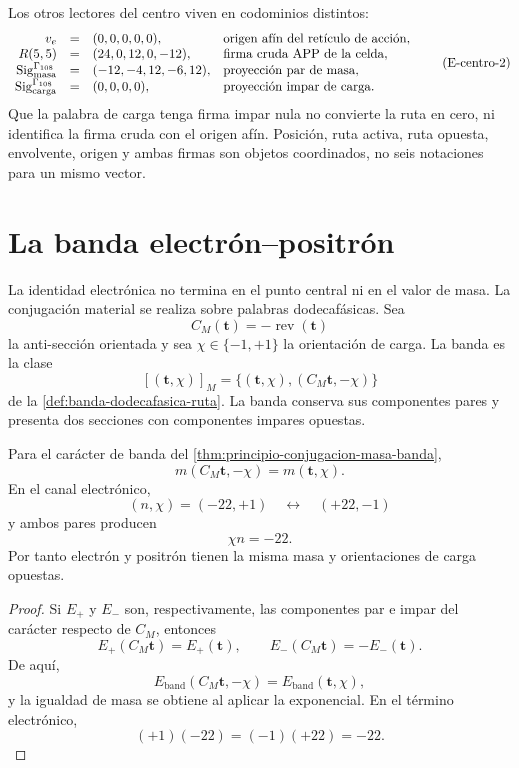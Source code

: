 Los otros lectores del centro viven en codominios distintos:
\[
\begin{array}{rcll}
 v_e&=&(0,0,0,0,0),
   &\text{origen afín del retículo de acción},\\
 R(5,5)&=&(24,0,12,0,-12),
   &\text{firma cruda APP de la celda},\\
 \operatorname{Sig}^{\Gamma_{108}}_{\rm masa}
   &=&(-12,-4,12,-6,12),
   &\text{proyección par de masa},\\
 \operatorname{Sig}^{\Gamma_{108}}_{\rm carga}
   &=&(0,0,0,0),
   &\text{proyección impar de carga}.
\end{array}
\tag{E-centro-2}\label{eq:electron-firmas-tipadas-rev8}
\]
Que la palabra de carga tenga firma impar nula no convierte la ruta en
cero, ni identifica la firma cruda con el origen afín. Posición, ruta
activa, ruta opuesta, envolvente, origen y ambas firmas son objetos
coordinados, no seis notaciones para un mismo vector.

\section{La banda electrón--positrón}

La identidad electrónica no termina en el punto central ni en el valor de
masa. La conjugación material se realiza sobre palabras dodecafásicas. Sea
\[
 C_M(\mathbf t)=-\operatorname{rev}(\mathbf t)
\]
la anti-sección orientada y sea
\(\chi\in\{-1,+1\}\) la orientación de carga. La banda es la clase
\[
 [(\mathbf t,\chi)]_M
 =
 \{(\mathbf t,\chi),(C_M\mathbf t,-\chi)\}
\]
de la \cref{def:banda-dodecafasica-ruta}. La banda conserva sus componentes
pares y presenta dos secciones con componentes impares opuestas.

\begin{theorem}
\label{thm:electron-positron-biografia-rev6}
Para el carácter de banda del
\cref{thm:principio-conjugacion-masa-banda},
\[
 m(C_M\mathbf t,-\chi)=m(\mathbf t,\chi).
\]
En el canal electrónico,
\[
 (n,\chi)=(-22,+1)
 \quad\longleftrightarrow\quad
 (+22,-1)
\]
y ambos pares producen
\[
 \chi n=-22.
\]
Por tanto electrón y positrón tienen la misma masa y orientaciones de
carga opuestas.
\end{theorem}

\begin{proof}
Si \(E_+\) y \(E_-\) son, respectivamente, las componentes par e impar del
carácter respecto de \(C_M\), entonces
\[
 E_+(C_M\mathbf t)=E_+(\mathbf t),
 \qquad
 E_-(C_M\mathbf t)=-E_-(\mathbf t).
\]
De aquí,
\[
 E_{\mathrm{band}}(C_M\mathbf t,-\chi)
 =
 E_{\mathrm{band}}(\mathbf t,\chi),
\]
y la igualdad de masa se obtiene al aplicar la exponencial. En el término
electrónico,
\[
 (+1)(-22)=(-1)(+22)=-22.
\]
\end{proof}


